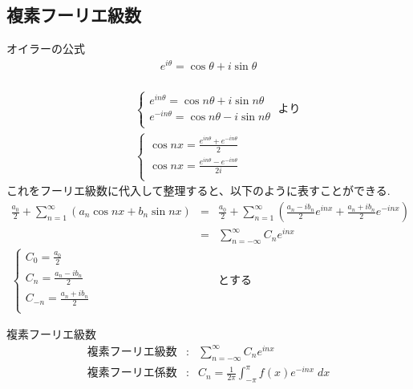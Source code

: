 \documentclass[a4paper]{jsarticle}
\begin{document}
\subsection{複素フーリエ級数}
\begin{itembox}[l]{オイラーの公式}
    \begin{eqnarray*}
        e^{i\theta} = \cos \theta + i \sin \theta\\
    \end{eqnarray*}
\end{itembox}
\begin{eqnarray*}
    &&\begin{cases}
        e^{in\theta} = \cos n\theta + i \sin n\theta  \\
        e^{-in\theta} = \cos n\theta - i \sin n\theta \\
    \end{cases}
    \; より\\
    &&\begin{cases}
        \displaystyle\cos nx = \frac{ e^{in\theta} +  e^{-in\theta}}{2}  \\
        \displaystyle\cos nx = \frac{ e^{in\theta} -  e^{-in\theta}}{2i} \\
    \end{cases}
\end{eqnarray*}
これをフーリエ級数に代入して整理すると、以下のように表すことができる.
\begin{eqnarray*}
    \frac{a_0}{2} + \sum^\infty_{n=1}\left(a_n \cos nx+b_n \sin nx\right)
    &=&\frac{a_0}{2} + \sum^\infty_{n=1}\left(\frac{a_n-ib_n}{2}e^{inx}+\frac{a_n+ib_n}{2}e^{-inx}\right)\\
    &=&\sum^\infty_{n=-\infty} C_n e^{inx}\\
    \begin{cases}
        \displaystyle C_0 = \frac{a_0}{2}         \\
        \displaystyle C_n = \frac{a_n-ib_n}{2}    \\
        \displaystyle C_{-n} = \frac{a_n+ib_n}{2} \\
    \end{cases}
    &&とする
\end{eqnarray*}
\begin{itembox}[l]{複素フーリエ級数}
    \begin{eqnarray*}
        複素フーリエ級数 &:& \sum^\infty_{n=-\infty} C_n e^{inx} \\
        複素フーリエ係数 &:& C_n = \frac{1}{2\pi} \int^{\pi}_{-\pi} f\left(x\right) e^{-inx} \;dx\\
    \end{eqnarray*}
\end{itembox}
\end{document}
